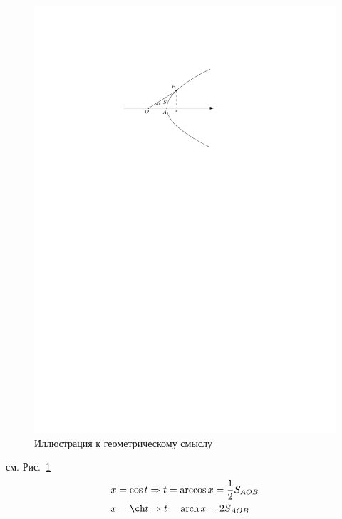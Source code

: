 \documentclass[12pt]{../../notes}
\begin{document}
\begin{figure}[t]
\begin{minipage}{0.48\linewidth}
    \includegraphics[scale=0.85]{achgeomsense}
  \end{minipage}
  \caption{Иллюстрация к геометрическому смыслу}
  \label{fig:acgeomsense}
\end{figure}
см. Рис.~\ref{fig:acgeomsense} 
\begin{align}
  &x = \cos t \Rightarrow t = \arccos x = \frac{1}{2}S_{AOB} \\
  &x = \ch t \Rightarrow t = \arch x = 2S_{AOB}
\end{align}
\end{document}
